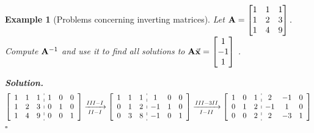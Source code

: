 \documentclass[12pt, a4paper]{article}
\newtheorem{eg}{Example}[subsection]
\newenvironment*{sol}{\par\indent\textbf{\textit{Solution. }}}{\hfill{$\square$}\par}
\def\vecx{\va{x}}
\def\matrixA{\vb{A}}
\begin{document}
\begin{eg}[Problems concerning inverting matrices]
	Let $\matrixA=\begin{bmatrix}1&1&1\\1&2&3\\1&4&9\end{bmatrix}.$ Compute $\matrixA^{-1}$ and use it to find all solutions to $\matrixA\vecx=\begin{bmatrix}1\\-1\\1\end{bmatrix}$	.\\
	\begin{sol}
		$$\begin{aligned}
			\left[\begin{array}{c:c}\begin{matrix}1&1&1\\1&2&3\\1&4&9\end{matrix}&\begin{matrix}1&0&0\\0&1&0\\0&0&1\end{matrix}\end{array}\right]&\xrightarrow[II-I]{III-I}\left[\begin{array}{c:c}\begin{matrix}1&1&1\\0&1&2\\0&3&8\end{matrix}&\begin{matrix}1&0&0\\-1&1&0\\-1&0&1\end{matrix}\end{array}\right]\xrightarrow[I-II]{III-3II}\left[\begin{array}{c:c}\begin{matrix}1&0&1\\0&1&2\\0&0&2\end{matrix}&\begin{matrix}2&-1&0\\-1&1&0\\2&-3&1\end{matrix}\end{array}\right]\\

\end{aligned}$$
\end{sol}
\end{eg}
\end{document}
